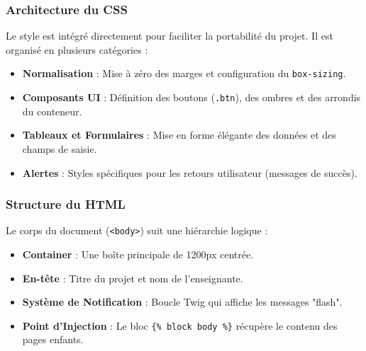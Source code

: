 \documentclass[12pt,a4paper]{article}
\begin{document}
\subsubsection{Architecture du CSS}
Le style est intégré directement pour faciliter la portabilité du projet. Il est organisé en plusieurs catégories :
\begin{itemize}
    \item \textbf{Normalisation} : Mise à zéro des marges et configuration du \texttt{box-sizing}.
    \item \textbf{Composants UI} : Définition des boutons (\texttt{.btn}), des ombres et des arrondis du conteneur.
    \item \textbf{Tableaux et Formulaires} : Mise en forme élégante des données et des champs de saisie.
    \item \textbf{Alertes} : Styles spécifiques pour les retours utilisateur (messages de succès).
\end{itemize}

\subsubsection{Structure du HTML}
Le corps du document (\texttt{<body>}) suit une hiérarchie logique :
\begin{itemize}
    \item \textbf{Container} : Une boîte principale de 1200px centrée.
    \item \textbf{En-tête} : Titre du projet et nom de l'enseignante.
    \item \textbf{Système de Notification} : Boucle Twig qui affiche les messages "flash".
    \item \textbf{Point d'Injection} : Le bloc \texttt{\{\% block body \%\}} récupère le contenu des pages enfants.
\end{itemize}
\end{document}
